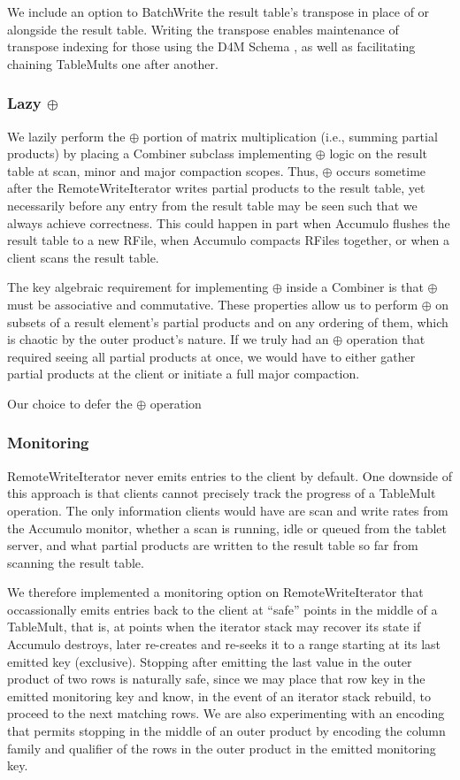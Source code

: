 We include an option to BatchWrite the result table's transpose in place of or alongside
the result table. Writing the transpose enables maintenance of transpose indexing for those using the 
D4M Schema \cite{kepner2013d4m}, as well as facilitating chaining TableMults one after another.

\subsubsection{Lazy $\oplus$}
We lazily perform the $\oplus$ portion of matrix multiplication (i.e., summing partial products)
by placing a Combiner subclass implementing $\oplus$ logic on the result table at scan, minor and major compaction scopes.
Thus, $\oplus$ occurs sometime after the RemoteWriteIterator writes partial products to the result table,
yet necessarily before any entry from the result table may be seen such that we always achieve correctness.
This could happen in part when Accumulo flushes the result table to a new RFile, when Accumulo compacts RFiles 
together, or when a client scans the result table. 

The key algebraic requirement for implementing $\oplus$ inside a Combiner
is that $\oplus$ must be associative and commutative.
These properties allow us to perform $\oplus$ on subsets of a result element's partial products 
and on any ordering of them, which is chaotic by the outer product's nature.
If we truly had an $\oplus$ operation that required seeing all partial products at once,
we would have to either gather partial products at the client or initiate a full major compaction.

Our choice to defer the $\oplus$ operation 

\subsubsection{Monitoring}
RemoteWriteIterator never emits entries to the client by default. 
One downside of this approach is that clients cannot precisely track the progress of a TableMult operation.
The only information clients would have are scan and write rates from the Accumulo monitor,
whether a scan is running, idle or queued from the tablet server, and what partial products 
are written to the result table so far from scanning the result table.

We therefore implemented a monitoring option on RemoteWriteIterator that occassionally emits entries
back to the client at ``safe'' points in the middle of a TableMult, that is,
at points when the iterator stack may recover its state if Accumulo destroys, later re-creates and re-seeks it
to a range starting at its last emitted key (exclusive).
Stopping after emitting the last value in the outer product of two rows is naturally safe, since we may place that row key
in the emitted monitoring key and know, in the event of an iterator stack rebuild, to proceed to the next matching rows.
We are also experimenting with an encoding that permits stopping in the middle of an outer product by encoding the 
column family and qualifier of the rows in the outer product in the emitted monitoring key.

